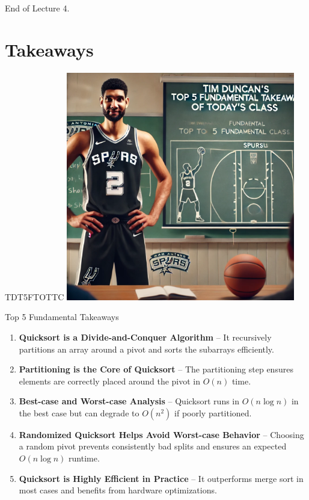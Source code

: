 \documentclass{beamer}
\begin{document}
\begin{frame}{}
    \centering
    \Huge End of Lecture 4.
\end{frame}

\section*{Takeaways}

\begin{frame}{TDT5FTOTTC}
    \centering
    \includegraphics[width=0.75\textwidth]{figures/tim.png}
\end{frame}

\begin{frame}{Top 5 Fundamental Takeaways}
    \small
    \begin{enumerate} \pause
        \item[5] \textbf{Quicksort is a Divide-and-Conquer Algorithm} – It recursively partitions an array around a pivot and sorts the subarrays efficiently.\pause

        \item[4] \textbf{Partitioning is the Core of Quicksort} – The partitioning step ensures elements are correctly placed around the pivot in $O(n)$ time.\pause

        \item[3] \textbf{Best-case and Worst-case Analysis} – Quicksort runs in $O(n \log n)$ in the best case but can degrade to $O(n^2)$ if poorly partitioned.\pause

        \item[2] \textbf{Randomized Quicksort Helps Avoid Worst-case Behavior} – Choosing a random pivot prevents consistently bad splits and ensures an expected $O(n \log n)$ runtime.\pause

        \item[1] \textbf{Quicksort is Highly Efficient in Practice} – It outperforms merge sort in most cases and benefits from hardware optimizations.

    \end{enumerate}
\end{frame}
\end{document}

